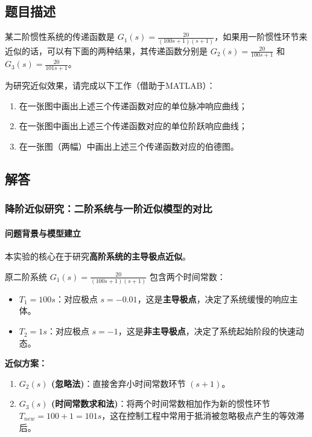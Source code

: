 \documentclass{article}
\begin{document}
\subsection*{题目描述}
某二阶惯性系统的传递函数是 \( G_1(s) = \frac{20}{(100s+1)(s+1)} \)，如果用一阶惯性环节来近似的话，可以有下面的两种结果，其传递函数分别是 \( G_2(s) = \frac{20}{100s+1} \) 和 \( G_3(s) = \frac{20}{101s+1} \)。

为研究近似效果，请完成以下工作（借助于MATLAB）：
\begin{enumerate}
    \item 在一张图中画出上述三个传递函数对应的单位脉冲响应曲线；
    \item 在一张图中画出上述三个传递函数对应的单位阶跃响应曲线；
    \item 在一张图（两幅）中画出上述三个传递函数对应的伯德图。
\end{enumerate}

\subsection*{解答}
\subsubsection*{降阶近似研究：二阶系统与一阶近似模型的对比}
\paragraph{问题背景与模型建立}
本实验的核心在于研究\textbf{高阶系统的主导极点近似}。

原二阶系统 \( G_1(s) = \frac{20}{(100s+1)(s+1)} \) 包含两个时间常数：
\begin{itemize}
    \item \textbf{\( T_1 = 100s \)}：对应极点 \( s = -0.01 \)，这是\textbf{主导极点}，决定了系统缓慢的响应主体。
    \item \textbf{\( T_2 = 1s \)}：对应极点 \( s = -1 \)，这是\textbf{非主导极点}，决定了系统起始阶段的快速动态。
\end{itemize}

\textbf{近似方案：}
\begin{enumerate}
    \item \textbf{\( G_2(s) \) (忽略法)}：直接舍弃小时间常数环节 \( (s+1) \)。
    \item \textbf{\( G_3(s) \) (时间常数求和法)}：将两个时间常数相加作为新的惯性环节 \( T_{new} = 100 + 1 = 101s \)，这在控制工程中常用于抵消被忽略极点产生的等效滞后。
\end{enumerate}
\end{document}
